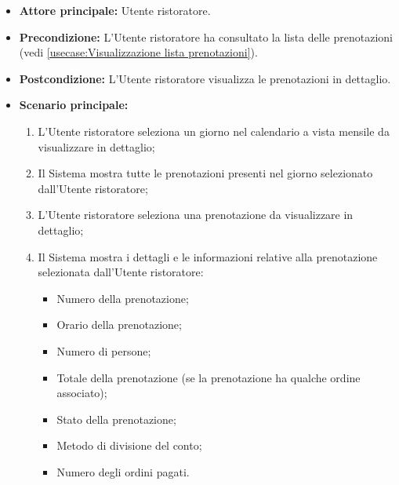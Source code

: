 \label{usecase:Visualizza dettaglio lista prenotazioni}
\begin{itemize}
	\item \textbf{Attore principale:} Utente ristoratore.

	\item \textbf{Precondizione:} L'Utente ristoratore ha consultato la lista delle prenotazioni (vedi \autoref{usecase:Visualizzazione lista prenotazioni}).

	\item \textbf{Postcondizione:} L'Utente ristoratore visualizza le prenotazioni in dettaglio.


	\item \textbf{Scenario principale:}
	      \begin{enumerate}
		      \item L'Utente ristoratore seleziona un giorno nel calendario a
				  vista mensile da visualizzare in dettaglio;
		      \item Il Sistema mostra tutte le prenotazioni presenti nel giorno selezionato dall'Utente ristoratore;

		      \item L'Utente ristoratore seleziona una prenotazione da visualizzare in dettaglio;
		      \item Il Sistema mostra i dettagli e le informazioni relative alla prenotazione selezionata dall'Utente ristoratore:
		            \begin{itemize}
			            \item Numero della prenotazione;
			            \item Orario della prenotazione;
			            \item Numero di persone;
						\item Totale della prenotazione (se la prenotazione ha
							qualche ordine associato);
			            \item Stato della prenotazione;
						\item Metodo di divisione del conto;
						\item Numero degli ordini pagati.
		            \end{itemize}
	      \end{enumerate}
\end{itemize}
